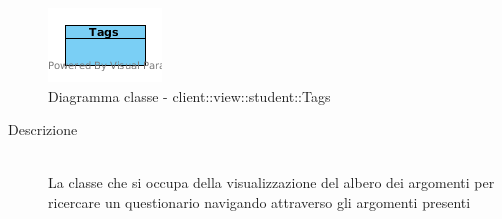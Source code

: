 \vspace{0.5cm}
\hypertarget{client::view::student::Tags}{}
\begin{center}
			\begin{figure}[H]
				\centering \includegraphics[scale=4, max width=\textwidth, max height=\myheight]{../img/diagrammiClassi/client/view/student/Tags.png}
				\caption{Diagramma classe - client::view::student::Tags}
			\end{figure}
		\end{center}\begin{description}
\item[Descrizione] \hfill \\
 La classe che si occupa della visualizzazione del albero dei argomenti per ricercare un questionario navigando attraverso gli argomenti presenti
\end{description}

